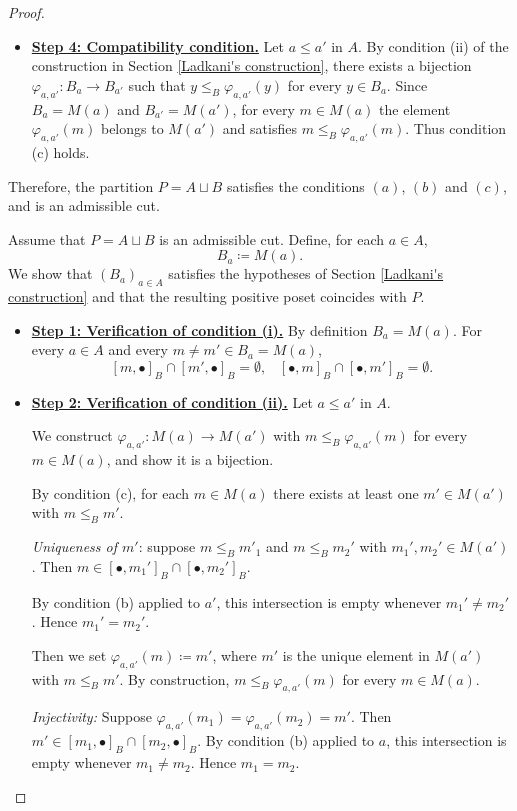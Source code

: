 \begin{proof}
\begin{itemize}
\item \textbf{\underline{Step 4: Compatibility condition.}} Let $a \leq a'$ in $A$. By condition (ii) of the construction in Section \ref{Ladkani's construction}, there exists a bijection $\varphi_{a,a'} \colon B_a \to B_{a'}$ such that $y \leq_B \varphi_{a,a'}(y)$ for every $y \in B_a$. Since $B_a=M(a)$ and $B_{a'}=M(a')$, for every $m \in M(a)$ the element $\varphi_{a,a'}(m)$ belongs to $M(a')$ and satisfies $m \leq_B \varphi_{a,a'}(m)$. Thus condition (c) holds.
\end{itemize}

Therefore, the partition $P=A \sqcup B$ satisfies the conditions $(a)$, $(b)$ and $(c)$, and is an admissible cut.
 
 \item[\boxed{(ii)\Rightarrow(i)}:] Assume that $P=A \sqcup B$ is an admissible cut. Define, for each $a  \in A$, \[B_a \coloneq M(a).\]
 We show that $(B_a)_{a \in A}$ satisfies the hypotheses of Section \ref{Ladkani's construction} and that the resulting positive poset coincides with $P$. 
\begin{itemize}
 \item \textbf{\underline{Step 1: Verification of condition (i).}} By definition $B_a=M(a)$. For every $a \in A$ and every $m \neq m' \in B_a=M(a)$,
 \[[m, \bullet]_B \cap [m', \bullet]_B = \emptyset, \,\,\,\,\, [\bullet,m]_B \cap [\bullet,m']_B = \emptyset.\]
 \item \textbf{\underline{Step 2: Verification of condition (ii).}} Let $a \leq a'$ in $A$. 
 
 We construct $\varphi_{a,a'} \colon M(a) \to M(a')$ with $m \leq_B \varphi_{a,a'}(m)$ for every $m \in M(a)$, and show it is a bijection.

 By condition (c), for each $m \in M(a)$ there exists at least one $m' \in M(a')$ with $m \leq_Bm'$.

 \textit{Uniqueness of $m'$}: suppose $m \leq_B m'_1$ and $m \leq_B m_2'$ with $m_1',m_2' \in M(a')$. Then $m \in [\bullet,m_1']_B \cap [\bullet,m_2']_B$. 
 
 By condition (b) applied to $a'$, this intersection is empty whenever $m_1' \neq m_2'$. Hence $m_1' = m_2'$.

 Then we set $\varphi_{a,a'}(m) \coloneq m'$, where $m'$ is the unique element in $M(a')$ with $m \leq_Bm'$.
 By construction, $m \leq_B \varphi_{a,a'}(m)$ for every $m \in M(a)$.
 
 \textit{Injectivity:} Suppose $\varphi_{a,a'}(m_1)=\varphi_{a,a'}(m_2)=m'$. Then $m' \in [m_1, \bullet]_B \cap [m_2, \bullet]_B$. By condition (b) applied to $a$, this intersection is empty whenever $m_1 \neq m_2$. Hence $m_1=m_2$.


\end{itemize}
\end{proof}
